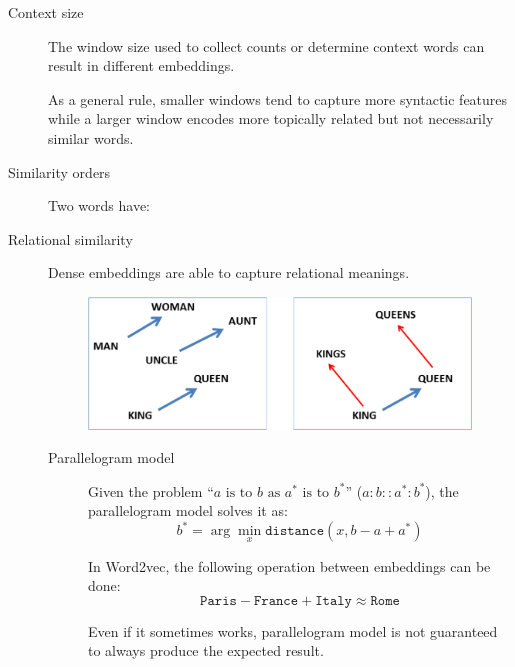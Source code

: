 \begin{description}
    \item[Context size] 
        The window size used to collect counts or determine context words can result in different embeddings.

        As a general rule, smaller windows tend to capture more syntactic features while a larger window encodes more topically related but not necessarily similar words.

    \item[Similarity orders] 
        Two words have:

    \item[Relational similarity] 
        Dense embeddings are able to capture relational meanings.

        \begin{figure}[H]
            \centering
            \includegraphics[width=0.45\linewidth]{./img/embedding_relations.png}
        \end{figure}

        \begin{description}
            \item[Parallelogram model] 
                Given the problem ``$a \text{ is to } b \text{ as } a^* \text{ is to } b^*$'' ($a : b :: a^* : b^*$), the parallelogram model solves it as:
                \[ b^* = \arg\min_x \texttt{distance}(x, b-a+a^*) \]

                \begin{example}
                    In Word2vec, the following operation between embeddings can be done:
                    \[ \texttt{Paris} - \texttt{France} + \texttt{Italy} \approx \texttt{Rome} \]
                \end{example}

                \begin{remark}
                    Even if it sometimes works, parallelogram model is not guaranteed to always produce the expected result.
                \end{remark}
        \end{description}
\end{description}


